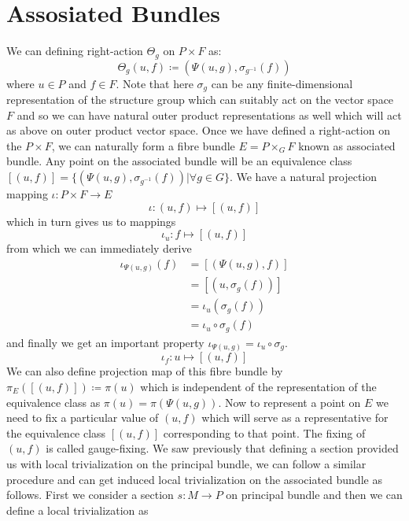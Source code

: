 \documentclass[12pt]{article}
\begin{document}
\section{Assosiated Bundles}
We can defining right-action $\Theta_{g}$ on $P\times F$ as:
\begin{equation*}
    \Theta_{g}(u, f) \coloneqq (\Psi(u, g), \sigma_{g^{-1}}(f))
\end{equation*} where $u\in P$ and $f\in F$. Note that here $\sigma_{g}$ can be any finite-dimensional representation of the structure group which can suitably act on the vector space $F$ and so we can have natural outer product representations as well which will act as above on outer product vector space. Once we have defined a right-action on the $P\times F$, we can naturally form a fibre bundle $E = P\times_{G}F$ known as associated bundle. Any point on the associated bundle will be an equivalence class $[(u, f)] = \{(\Psi(u, g), \sigma_{g^{-1}}(f))| \forall g \in G\}$. We have a natural projection mapping $\iota\colon P\times F\to E$ \\
\[
\iota\colon (u, f)\mapsto [(u, f)]
\]
which in turn gives us to mappings \\
\begin{equation*}
    \iota_{u}\colon f\mapsto [(u, f)]
\end{equation*} from which we can immediately derive
\begin{align*}
    \iota_{\Psi(u, g)}(f) &= [(\Psi(u, g), f)] \\
                          &= [(u, \sigma_{g}(f))] \\
                          &= \iota_{u}(\sigma_{g}(f)) \\
                          &= \iota_{u}\circ\sigma_{g}(f)
\end{align*} and finally we get an important property $\iota_{\Psi(u, g)} = \iota_{u}\circ\sigma_{g}$.
\begin{equation*}
    \iota_{f}\colon u\mapsto [(u, f)]
\end{equation*} We can also define projection map of this fibre bundle by $\pi_{E}([(u, f)]) \coloneqq \pi(u)$ which is independent of the representation of the equivalence class as $\pi(u) = \pi(\Psi(u, g))$.
Now to represent a point on $E$ we need to fix a particular value of $(u, f)$ which will serve as a representative for the equivalence class $[(u, f)]$ corresponding to that point. The fixing of $(u, f)$ is called gauge-fixing. We saw previously that defining a section provided us with local trivialization on the principal bundle, we can follow a similar procedure and can get induced local trivialization on the associated bundle as follows. First we consider a section $s\colon M\to P$ on principal bundle and then we can define a local trivialization as
\end{document}
